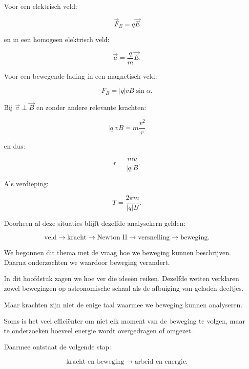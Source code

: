 \documentclass{ximera}
\begin{document}
Voor een elektrisch veld:

\[
\boxed{
\vec F_E=q\vec E
}
\]

en in een homogeen elektrisch veld:

\[
\boxed{
\vec a=\frac qm\vec E.
}
\]

Voor een bewegende lading in een magnetisch veld:

\[
\boxed{
F_B=|q|vB\sin\alpha.
}
\]

Bij $\vec v\perp\vec B$ en zonder andere relevante krachten:

\[
|q|vB=m\frac{v^2}{r}
\]

en dus:

\[
\boxed{
r=\frac{mv}{|q|B}.
}
\]

Als verdieping:

\[
\boxed{
T=\frac{2\pi m}{|q|B}.
}
\]

Doorheen al deze situaties blijft dezelfde analysekern gelden:

\[
\boxed{
\text{veld}
\rightarrow
\text{kracht}
\rightarrow
\text{Newton II}
\rightarrow
\text{versnelling}
\rightarrow
\text{beweging}.
}
\]





We begonnen dit thema met de vraag hoe we beweging kunnen beschrijven.
Daarna onderzochten we waardoor beweging verandert.

In dit hoofdstuk zagen we hoe ver die ideeën reiken. Dezelfde wetten
verklaren zowel bewegingen op astronomische schaal als de afbuiging van
geladen deeltjes.

Maar krachten zijn niet de enige taal waarmee we beweging kunnen
analyseren.

Soms is het veel efficiënter om niet elk moment van de beweging te
volgen, maar te onderzoeken hoeveel energie wordt overgedragen of
omgezet.

Daarmee ontstaat de volgende stap:

\[
\boxed{
\text{kracht en beweging}
\longrightarrow
\text{arbeid en energie}.
}
\]
\end{document}
